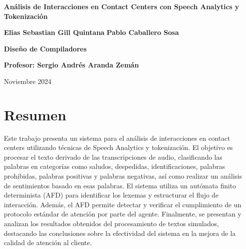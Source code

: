 \documentclass[12pt,a4paper]{scrartcl} %
\begin{document}
\begin{titlepage}
	\begin{center}
		\vspace*{1cm}

		\textbf{\LARGE{Análisis de Interacciones en Contact Centers con
				Speech Analytics y Tokenización}}

		\vspace{2cm}

		\textbf{\large{Elias Sebastian Gill Quintana}}
        \textbf{\large{Pablo Caballero Sosa}}

		\vfill

		\textbf{\large{Diseño de Compiladores}}

		\vspace{0.5cm}

		\textbf{\large{Profesor: Sergio Andrés Aranda Zemán}}

		\vspace{1.5cm}

		Noviembre 2024

		\vfill

	\end{center}
\end{titlepage}

\vspace{7mm}


\tableofcontents
\newpage

\section*{\centering Resumen}
Este trabajo presenta un sistema para el análisis de interacciones en contact centers
utilizando técnicas de Speech Analytics y tokenización. El objetivo es procesar el texto
derivado de las transcripciones de audio, clasificando las palabras en categorías como saludos,
despedidas, identificaciones, palabras prohibidas, palabras positivas y palabras negativas, así
como realizar un análisis de sentimientos basado en esas palabras. El sistema utiliza un
autómata finito determinista (AFD) para identificar los lexemas y estructurar el flujo de
interacción. Además, el AFD permite detectar y verificar el cumplimiento de un protocolo
estándar de atención por parte del agente. Finalmente, se presentan y analizan los resultados
obtenidos del procesamiento de textos simulados, destacando las conclusiones sobre la
efectividad del sistema en la mejora de la calidad de atención al cliente.
\end{document}

